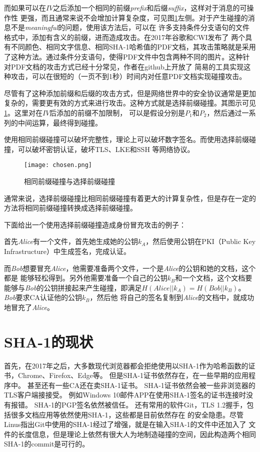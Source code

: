 而如果可以在$IV$之后添加一个相同的前缀\textit{prefix}和后缀\textit{suffix}，这样对于消息的可操作性
更强，而且通常来说不会增加计算复杂度，可见图\ref{fig:chosen}左侧。对于产生碰撞的消息不是\textit{meaningful}的问题，使用该方法后，可以在
许多支持条件分支语句的文件格式中，添加有含义的前缀，进而造成攻击。在2017年谷歌和CWI发布了
两个具有不同颜色、相同文字信息、相同SHA-1哈希值的PDF文档\cite{stevens2017first}，其攻击策略就是采用了这种方法。通过条件分支语句，使得PDF文件中包含两种不同的图片。这种针对PDF文档的攻击方式已经十分常见，作者在github上开放了
简易的工具实现这种攻击，可以在很短的（一页不到1秒）时间内对任意PDF文档实现碰撞攻击。

尽管有了这种添加前缀和后缀的攻击方式，但是网络世界中的安全协议通常是更加复杂的，需要更有效的方式来进行攻击。这种方式就是选择前缀碰撞。其图示可见\ref{fig:chosen}。这里对在$IV$后添加的前缀不加限制，
可以是假设分别是$P_1$和$P_2$，然后通过一系列的中间运算，最终得到碰撞。

使用相同前缀碰撞可以破坏完整性，理论上可以破坏数字签名。而使用选择前缀碰撞，可以破坏密钥认证，破坏TLS、LKE和SSH
等网络协议。
\begin{figure}[h]
    \centering
    \texttt{[image: chosen.png]}
    \caption{相同前缀碰撞与选择前缀碰撞}
    \label{fig:chosen}
\end{figure}


通常来说，选择前缀碰撞比相同前缀碰撞有着更大的计算复杂性，但是存在一定的方法将相同前缀碰撞转换成选择前缀碰撞。


下面给出一个使用选择前缀碰撞造成身份冒充攻击的例子：

首先\textit{Alice}有一个文件，首先她生成她的公钥$k_A$，然后使用公钥在PKI（Public Key Infrastructure）中生成签名，完成认证。

而\textit{Bob}想要冒充\textit{Alice}，他需要准备两个文件，一个是\textit{Alice}的公钥和她的文档，这个都是
能够轻松得到。另外他需要准备一个自己的公钥$k_B$和一个文档，这个文档要能够与\textit{Bob}的公钥拼接起来产生碰撞，即满足$H(Alice||k_A)=H(Bob||k_B)$。\textit{Bob}要求CA认证他的公钥$k_B$，然后他
将自己的签名复制到\textit{Alice}的文档中，就成功地冒充了\textit{Alice}。

\section{SHA-1的现状}
首先，在2017年之后，大多数现代浏览器都会拒绝使用以SHA-1作为哈希函数的证书，Chrome、Firefox、Edge等。
但是SHA-1证书依然存在，在一些早期的应用程序中。
甚至还有一些CA还在卖SHA-1证书。
SHA-1证书依然会被一些非浏览器的TLS客户端接接受。
例如Windows 10邮件APP在使用SHA-1签名的证书连接时没有报错。
SHA-1的PGP签名依然被信任。
还有常用的软件Git，TLS 1.2握手，包括很多文档应用等依然使用SHA-1，这些都是目前依然存在
的安全隐患。尽管Linus指出Git中使用的SHA-1经过了增强，就是在输入SHA-1的文件中还加入了
文件的长度信息，但是理论上依然有很大人为地制造碰撞的空间，因此构造两个相同SHA-1的commit是可行的。


